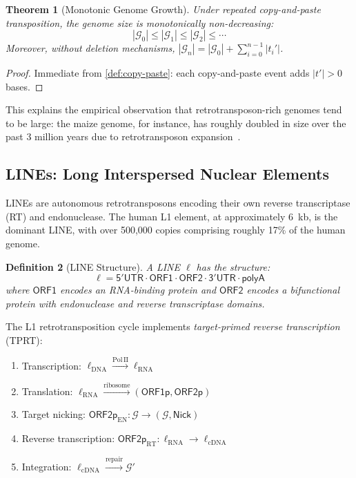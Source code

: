 \documentclass[12pt,a4paper]{article}
\newtheorem{theorem}{Theorem}[section]
\newtheorem{definition}[theorem]{Definition}
\newcommand{\Genome}{\mathcal{G}}
\begin{document}
\begin{theorem}[Monotonic Genome Growth]\label{thm:growth}
Under repeated copy-and-paste transposition, the genome size is monotonically
non-decreasing:
\[
  |\Genome_0| \leq |\Genome_1| \leq |\Genome_2| \leq \cdots
\]
Moreover, without deletion mechanisms, $|\Genome_n| = |\Genome_0| + \sum_{i=0}^{n-1} |t_i'|$.
\end{theorem}

\begin{proof}
Immediate from \cref{def:copy-paste}: each copy-and-paste event adds $|t'| > 0$ bases.
\end{proof}

This explains the empirical observation that retrotransposon-rich genomes tend to be
large: the maize genome, for instance, has roughly doubled in size over the past
3 million years due to retrotransposon expansion~\cite{sanmiguel1998}.

\subsection{LINEs: Long Interspersed Nuclear Elements}

LINEs are autonomous retrotransposons encoding their own reverse transcriptase (RT)
and endonuclease. The human L1 element, at approximately 6~kb, is the dominant LINE,
with over 500{,}000 copies comprising roughly 17\% of the human genome.

\begin{definition}[LINE Structure]\label{def:line}
A LINE $\ell$ has the structure:
\[
  \ell = \mathsf{5'UTR} \cdot \mathsf{ORF1} \cdot \mathsf{ORF2} \cdot \mathsf{3'UTR} \cdot \mathsf{polyA}
\]
where $\mathsf{ORF1}$ encodes an RNA-binding protein and $\mathsf{ORF2}$ encodes
a bifunctional protein with endonuclease and reverse transcriptase domains.
\end{definition}

The L1 retrotransposition cycle implements \emph{target-primed reverse transcription}
(TPRT):
\begin{enumerate}[label=\arabic*.]
  \item Transcription: $\ell_{\mathrm{DNA}} \xrightarrow{\mathrm{Pol\,II}} \ell_{\mathrm{RNA}}$
  \item Translation: $\ell_{\mathrm{RNA}} \xrightarrow{\mathrm{ribosome}} (\mathsf{ORF1p}, \mathsf{ORF2p})$
  \item Target nicking: $\mathsf{ORF2p}_{\mathrm{EN}} : \Genome \to (\Genome, \mathsf{Nick})$
  \item Reverse transcription: $\mathsf{ORF2p}_{\mathrm{RT}} : \ell_{\mathrm{RNA}} \to \ell_{\mathrm{cDNA}}$
  \item Integration: $\ell_{\mathrm{cDNA}} \xrightarrow{\mathrm{repair}} \Genome'$
\end{enumerate}
\end{document}
